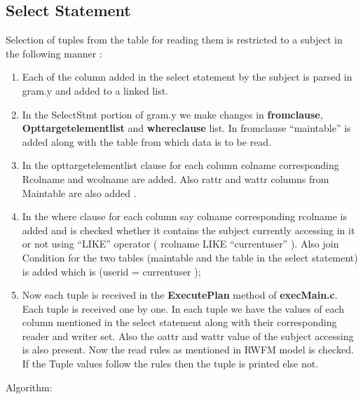 \documentclass[11pt,a4paper]{report}
\begin{document}
\subsection{Select Statement}
 Selection of tuples from the table for reading them is restricted to a subject in the following manner : 
 \begin{enumerate}
     \item Each of the column added in the select statement by the subject is parsed in gram.y and added to a linked list.
     \item  In the SelectStmt portion of gram.y we make changes in \textbf{from\textunderscore clause}, \textbf{Opt\textunderscore targetelement\textunderscore list} and \textbf{where\textunderscore clause} list. In from\textunderscore clause “main\textunderscore table” is added along with the table from which data is to be read.
     \item  In the opt\textunderscore targetelement\textunderscore list clause for each column col\textunderscore name corresponding R\textunderscore col\textunderscore name and w\textunderscore col\textunderscore name are added. Also r\textunderscore attr and w\textunderscore attr columns from Main\textunderscore table are also added .
     \item  In the where clause for each column say col\textunderscore name corresponding r\textunderscore col\textunderscore name is added and is checked whether it contains the subject currently accessing in it or not using “LIKE” operator ( r\textunderscore col\textunderscore name LIKE “current\textunderscore user” ). Also join   Condition for the two tables (main\textunderscore table and the table in the select statement) is added which is (user\textunderscore id = current\textunderscore user );
     \item Now each tuple is received in the \textbf{ExecutePlan} method of \textbf{execMain.c}. Each tuple is received one by one. In each tuple we have the values of each column mentioned in the select statement along with their corresponding reader and writer set. Also the o\textunderscore attr and w\textunderscore attr value of the subject accessing is also present. Now the read rules as mentioned in RWFM model is checked. If the Tuple values follow the rules then the tuple is printed else not.   
 \end{enumerate}
 \newpage
Algorithm:
\end{document}
